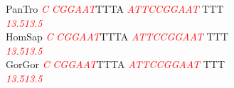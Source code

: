 \documentclass[11pt,twoside,reqno,a4paper]{article}
\begin{document}
{PanTro	\textit{\textcolor{red}{C}}	\textit{\textcolor{red}{C}}\textit{\textcolor{red}{G}}\textit{\textcolor{red}{G}}\textit{\textcolor{red}{A}}\textit{\textcolor{red}{A}}\textit{\textcolor{red}{T}}TTTA	\textit{\textcolor{red}{A}}\textit{\textcolor{red}{T}}\textit{\textcolor{red}{T}}\textit{\textcolor{red}{C}}\textit{\textcolor{red}{C}}\textit{\textcolor{red}{G}}\textit{\textcolor{red}{G}}\textit{\textcolor{red}{A}}\textit{\textcolor{red}{A}}\textit{\textcolor{red}{T}}	TTT\\
\hspace*{7\charwidth}\hspace*{0\charwidth}\textit{\textcolor{red}{13.5}}\hspace*{1\charwidth}\hspace*{1\charwidth}\hspace*{7\charwidth}\textit{\textcolor{red}{13.5}}\hspace*{1\charwidth}\\
HomSap	\textit{\textcolor{red}{C}}	\textit{\textcolor{red}{C}}\textit{\textcolor{red}{G}}\textit{\textcolor{red}{G}}\textit{\textcolor{red}{A}}\textit{\textcolor{red}{A}}\textit{\textcolor{red}{T}}TTTA	\textit{\textcolor{red}{A}}\textit{\textcolor{red}{T}}\textit{\textcolor{red}{T}}\textit{\textcolor{red}{C}}\textit{\textcolor{red}{C}}\textit{\textcolor{red}{G}}\textit{\textcolor{red}{G}}\textit{\textcolor{red}{A}}\textit{\textcolor{red}{A}}\textit{\textcolor{red}{T}}	TTT\\
\hspace*{7\charwidth}\hspace*{0\charwidth}\textit{\textcolor{red}{13.5}}\hspace*{1\charwidth}\hspace*{1\charwidth}\hspace*{7\charwidth}\textit{\textcolor{red}{13.5}}\hspace*{1\charwidth}\\
GorGor	\textit{\textcolor{red}{C}}	\textit{\textcolor{red}{C}}\textit{\textcolor{red}{G}}\textit{\textcolor{red}{G}}\textit{\textcolor{red}{A}}\textit{\textcolor{red}{A}}\textit{\textcolor{red}{T}}TTTA	\textit{\textcolor{red}{A}}\textit{\textcolor{red}{T}}\textit{\textcolor{red}{T}}\textit{\textcolor{red}{C}}\textit{\textcolor{red}{C}}\textit{\textcolor{red}{G}}\textit{\textcolor{red}{G}}\textit{\textcolor{red}{A}}\textit{\textcolor{red}{A}}\textit{\textcolor{red}{T}}	TTT\\
\hspace*{7\charwidth}\hspace*{0\charwidth}\textit{\textcolor{red}{13.5}}\hspace*{1\charwidth}\hspace*{1\charwidth}\hspace*{7\charwidth}\textit{\textcolor{red}{13.5}}\hspace*{1\charwidth}\\
}
\end{document}
